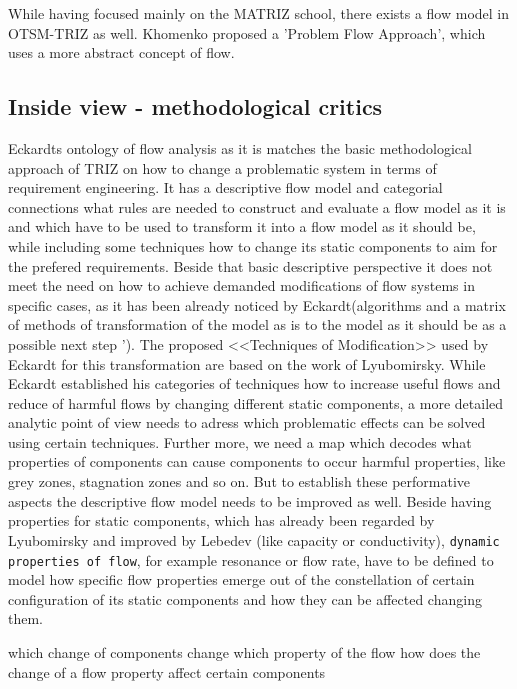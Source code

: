 \documentclass[a4paper,11pt]{article}
\begin{document}
        While having focused mainly on the MATRIZ school, there exists a flow model in OTSM-TRIZ as well. Khomenko proposed a 'Problem Flow Approach',
        which uses a more abstract concept of flow. 

        

        \subsection{Inside view - methodological critics}
        Eckardts ontology of flow analysis as it is matches the basic methodological approach of TRIZ on how to change a problematic system in terms 
        of requirement engineering. It has a descriptive flow model and categorial connections what rules are needed to construct and evaluate a 
        flow model as it is and which have to be used to transform it into a flow model as it should be, while including some techniques how to change
        its static components to aim for the prefered requirements. Beside that basic descriptive perspective it does not meet the need on how
        to achieve demanded modifications of flow systems in specific cases, as it has been already noticed by Eckardt(algorithms and a matrix
        of methods of transformation of the model as is to the model as it should be as a possible next step \cite{Eckardt2020}').
        The proposed <<Techniques of Modification>> used by Eckardt for this transformation are based on the work of Lyubomirsky. While Eckardt established
        his categories of techniques how to increase useful flows and reduce of harmful flows by changing different static components, a more detailed analytic 
        point of view needs to adress which problematic effects can be solved using certain techniques. Further more, we need a map which decodes what
        properties of components can cause components to occur harmful properties, like grey zones, stagnation zones and so on. 
        But to establish these performative aspects the descriptive flow model needs to be improved as well. 
        Beside having properties for static components, which has already been regarded by Lyubomirsky and improved by Lebedev (like capacity or conductivity),
        \texttt{dynamic properties of flow}, for example resonance or flow rate, have to be
        defined to model how specific flow properties emerge out of the constellation of certain configuration of its static components and how they can be affected
        changing them.

        which change of components change which property of the flow
        how does the change of a flow property affect certain components
        
\end{document}
